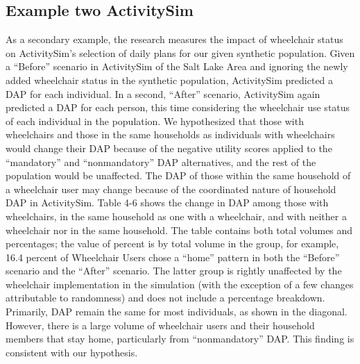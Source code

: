 \documentclass[3p, authoryear, review]{elsarticle} %
\begin{document}
\hypertarget{example-two-activitysim}{%
\subsection{Example two ActivitySim}\label{example-two-activitysim}}

As a secondary example, the research measures the impact of
wheelchair status on ActivitySim's selection of daily plans for our given
synthetic population. Given a ``Before'' scenario in ActivitySim of the Salt Lake
Area and ignoring the newly added wheelchair status in the synthetic population,
ActivitySim predicted a DAP for each individual. In a second, ``After'' scenario,
ActivitySim again predicted a DAP for each person, this time considering the
wheelchair use status of each individual in the population. We hypothesized that
those with wheelchairs and those in the same households as individuals with
wheelchairs would change their DAP because of the negative utility scores
applied to the ``mandatory'' and ``nonmandatory'' DAP alternatives, and the rest of
the population would be unaffected. The DAP of those within the same household
of a wheelchair user may change because of the coordinated nature of household
DAP in ActivitySim. Table 4-6 shows the change in DAP among those with
wheelchairs, in the same household as one with a wheelchair, and with neither a
wheelchair nor in the same household. The table contains both total volumes and
percentages; the value of percent is by total volume in the group, for example,
16.4 percent of Wheelchair Users chose a ``home'' pattern in both the ``Before''
scenario and the ``After'' scenario. The latter group is rightly unaffected by
the wheelchair implementation in the simulation (with the exception of a few
changes attributable to randomness) and does not include a percentage breakdown.
Primarily, DAP remain the same for most individuals, as shown in the diagonal.
However, there is a large volume of wheelchair users and their household members
that stay home, particularly from ``nonmandatory'' DAP. This finding is consistent
with our hypothesis.
\end{document}
